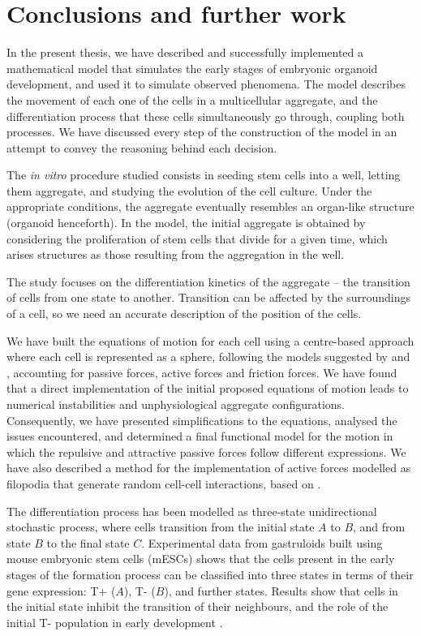 \chapter{Conclusions and further work}

In the present thesis, we have described and successfully implemented a mathematical model that simulates the early stages of embryonic organoid development, and used it to simulate observed phenomena. The model describes the movement of each one of the cells in a multicellular aggregate, and the differentiation process that these cells simultaneously go through, coupling both processes. We have discussed every step of the construction of the model in an attempt to convey the reasoning behind each decision.

The \textit{in vitro} procedure studied consists in seeding stem cells into a well, letting them aggregate, and studying the evolution of the cell culture. Under the appropriate conditions, the aggregate eventually resembles an organ-like structure (organoid henceforth). In the model, the initial aggregate is obtained by considering the proliferation of stem cells that divide for a given time, which arises structures as those resulting from the aggregation in the well.

The study focuses on the differentiation kinetics of the aggregate -- the transition of cells from one state to another. Transition can be affected by the surroundings of a cell, so we need an accurate description of the position of the cells. 

We have built the equations of motion for each cell using a centre-based approach where each cell is represented as a sphere, following the models suggested by \cite{Liedekerke_2015} and \cite{Saiz_2020}, accounting for passive forces, active forces and friction forces. We have found that a direct implementation of the initial proposed equations of motion leads to numerical instabilities and unphysiological aggregate configurations. Consequently, we have presented simplifications to the equations, analysed the issues encountered, and determined a final functional model for the motion in which the repulsive and attractive passive forces follow different expressions. We have also described a method for the implementation of active forces modelled as filopodia that generate random cell-cell interactions, based on \cite{Oriola_2022}.

The differentiation process has been modelled as three-state unidirectional sto\-chastic process, where cells transition from the initial state $A$ to $B$, and from state $B$ to the final state $C$. Experimental data from gastruloids built using mouse embryonic stem cells (mESCs) shows that the cells present in the early stages of the formation process can be classified into three states in terms of their gene expression: T+ ($A$), T- ($B$), and further states. Results show that cells in the initial state inhibit the transition of their neighbours, and the role of the initial T- population in early development \parencite{Oriola_2025}. 

